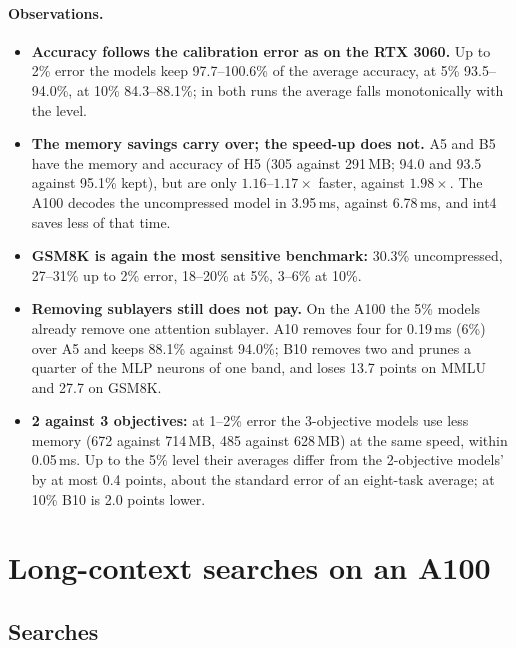 \documentclass[11pt]{article}
\begin{document}
\FloatBarrier
\paragraph{Observations.}
\begin{itemize}
  \item \textbf{Accuracy follows the calibration error as on the RTX 3060.} Up to 2\% error the models
        keep 97.7--100.6\% of the average accuracy, at 5\% 93.5--94.0\%, at 10\% 84.3--88.1\%; in both
        runs the average falls monotonically with the level.
  \item \textbf{The memory savings carry over; the speed-up does not.} A5 and B5 have the memory and
        accuracy of H5 (305 against 291\,MB; 94.0 and 93.5 against 95.1\% kept), but are only
        $1.16$--$1.17\times$ faster, against $1.98\times$. The A100 decodes the uncompressed model in
        3.95\,ms, against 6.78\,ms, and int4 saves less of that time.
  \item \textbf{GSM8K is again the most sensitive benchmark:} 30.3\% uncompressed, 27--31\% up to 2\%
        error, 18--20\% at 5\%, 3--6\% at 10\%.
  \item \textbf{Removing sublayers still does not pay.} On the A100 the 5\% models already remove one
        attention sublayer. A10 removes four for 0.19\,ms (6\%) over A5 and keeps 88.1\% against
        94.0\%; B10 removes two and prunes a quarter of the MLP neurons of one band, and loses 13.7
        points on MMLU and 27.7 on GSM8K.
  \item \textbf{2 against 3 objectives:} at 1--2\% error the 3-objective models use less memory
        (672 against 714\,MB, 485 against 628\,MB) at the same speed, within 0.05\,ms. Up to the 5\%
        level their averages differ from the 2-objective models' by at most 0.4 points, about the
        standard error of an eight-task average; at 10\% B10 is 2.0 points lower.
\end{itemize}

\clearpage
\section{Long-context searches on an A100}
\label{sec:turn}

\subsection{Searches}
\end{document}
